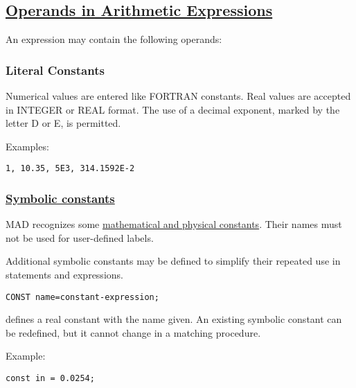 \subsection{\href{operand}{Operands in Arithmetic Expressions}} 
An expression may contain the following operands:  

\subsubsection{Literal Constants} 
Numerical values are entered like FORTRAN constants. Real values are
accepted in INTEGER or REAL format. The use of a decimal exponent,
marked by the letter D or E, is permitted.  

Examples: 
\begin{verbatim}
1, 10.35, 5E3, 314.1592E-2
\end{verbatim}

\subsubsection{\href{constant}{Symbolic constants}} 
MAD recognizes some \hyperlink{constant}{mathematical and physical
  constants}. Their names must not be used for user-defined labels.  

Additional symbolic constants may be defined to simplify their repeated
use in statements and expressions.  

\begin{verbatim}
CONST name=constant-expression;
\end{verbatim} 
defines a real constant with the name given. An existing symbolic constant can be redefined, but it cannot change in a matching procedure. 

Example: 
\begin{verbatim}
const in = 0.0254;
\end{verbatim}

